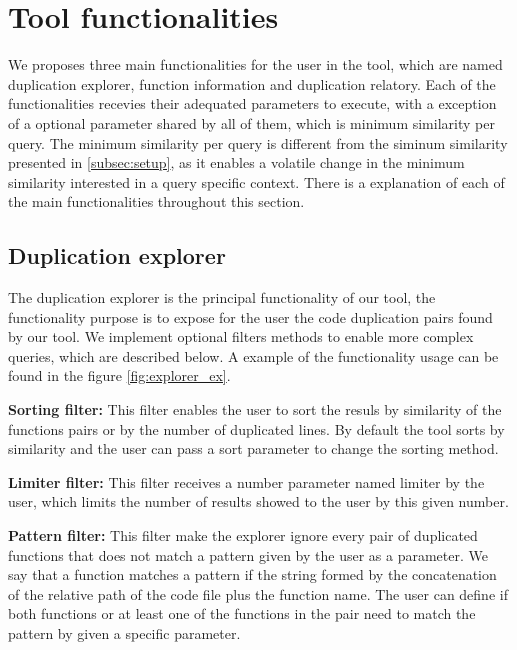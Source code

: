 \en

\section{Tool functionalities}
\label{subsec:func}

We proposes three main functionalities for the user in the tool, which are named duplication explorer, function information
and duplication relatory. Each of the functionalities recevies their adequated parameters to execute, with a exception
of a optional parameter shared by all of them, which is minimum similarity per query. The minimum similarity per query is different
from the siminum similarity presented in \ref{subsec:setup}, as it enables a volatile change in the minimum similarity
interested in a query specific context. There is a explanation of each of the main functionalities throughout this section.

\subsection{Duplication explorer}

The duplication explorer is the principal functionality of our tool, the functionality purpose is to expose for the user the code duplication
pairs found by our tool. We implement optional filters methods to enable more complex queries, which are described below. A example
of the functionality usage can be found in the figure \ref{fig:explorer_ex}.


\begin{itemize}
	\begin{item}
		\textbf{Sorting filter:} This filter enables the user to sort the resuls by similarity of the functions pairs or 
		by the number of duplicated lines. By default the tool sorts by similarity and the user can pass a sort parameter to change
		the sorting method.
	\end{item}

	\begin{item}
		\textbf{Limiter filter:} This filter receives a number parameter named limiter by the user, which limits the number of results
		showed to the user by this given number.
	\end{item}

	\begin{item}
		\textbf{Pattern filter:} This filter make the explorer ignore every pair of duplicated functions that does not match a pattern
		given by the user as a parameter. We say that a function matches a pattern if the string formed by the concatenation of
		the relative path of the code file plus the function name. The user can define if both functions or at least one of the 
		functions in the pair need to match the pattern by given a specific parameter.
	\end{item}
\end{itemize}

